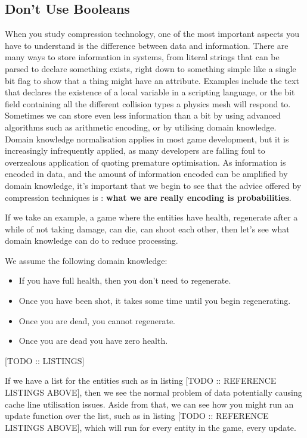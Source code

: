 \documentclass[a4paper,12pt]{article}
\begin{document}
\subsection{Don't Use Booleans}

When you study compression technology, one of the most important aspects you have to understand is the difference between data and information.
There are many ways to store information in systems, from literal strings that can be parsed to declare something exists, right down to something simple like a single bit flag to show that a thing might have an attribute.
Examples include the text that declares the existence of a local variable in a scripting language, or the bit field containing all the different collision types a physics mesh will respond to.
Sometimes we can store even less information than a bit by using advanced algorithms such as arithmetic encoding, or by utilising domain knowledge.
Domain knowledge normalisation applies in most game development, but it is increasingly infrequently applied, as many developers are falling foul to overzealous application of quoting premature optimisation.
As information is encoded in data, and the amount of information encoded can be amplified by domain knowledge, it's important that we begin to see that the advice offered by compression techniques is :
\textbf{what we are really encoding is probabilities}.

If we take an example, a game where the entities have health, regenerate after a while of not taking damage, can die, can shoot each other, then let's see what domain knowledge can do to reduce processing.

We assume the following domain knowledge:

\begin{itemize}
      \item
            If you have full health, then you don't need to regenerate.
      \item
            Once you have been shot, it takes some time until you begin regenerating.
      \item
            Once you are dead, you cannot regenerate.
      \item
            Once you are dead you have zero health.
\end{itemize}

[TODO :: LISTINGS]

If we have a list for the entities such as in listing [TODO :: REFERENCE LISTINGS ABOVE], then we see the normal problem of data potentially causing cache line utilisation issues.
Aside from that, we can see how you might run an update function over the list, such as in listing [TODO :: REFERENCE LISTINGS ABOVE], which will run for every entity in the game, every update.
\end{document}
